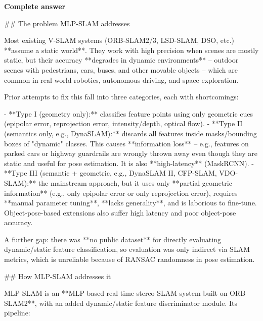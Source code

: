 \documentclass[10pt]{article}
\begin{document}
\textbf{Complete answer}
\begin{AnswerText}
## The problem MLP-SLAM addresses

Most existing V-SLAM systems (ORB-SLAM2/3, LSD-SLAM, DSO, etc.) **assume a static world**. They work with high precision when scenes are mostly static, but their accuracy **degrades in dynamic environments** -- outdoor scenes with pedestrians, cars, buses, and other movable objects -- which are common in real-world robotics, autonomous driving, and space exploration.

Prior attempts to fix this fall into three categories, each with shortcomings:

- **Type I (geometry only):** classifies feature points using only geometric cues (epipolar error, reprojection error, intensity/depth, optical flow).
- **Type II (semantics only, e.g., DynaSLAM):** discards all features inside masks/bounding boxes of "dynamic" classes. This causes **information loss** -- e.g., features on parked cars or highway guardrails are wrongly thrown away even though they are static and useful for pose estimation. It is also **high-latency** (MaskRCNN).
- **Type III (semantic + geometric, e.g., DynaSLAM II, CFP-SLAM, VDO-SLAM):** the mainstream approach, but it uses only **partial geometric information** (e.g., only epipolar error or only reprojection error), requires **manual parameter tuning**, **lacks generality**, and is laborious to fine-tune. Object-pose-based extensions also suffer high latency and poor object-pose accuracy.

A further gap: there was **no public dataset** for directly evaluating dynamic/static feature classification, so evaluation was only indirect via SLAM metrics, which is unreliable because of RANSAC randomness in pose estimation.

## How MLP-SLAM addresses it

MLP-SLAM is an **MLP-based real-time stereo SLAM system built on ORB-SLAM2**, with an added dynamic/static feature discriminator module. Its pipeline:


\end{AnswerText}
\end{document}
